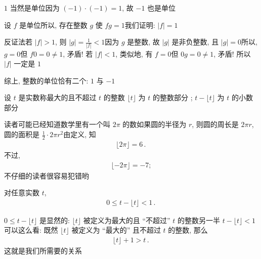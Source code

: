 \begin{pf}
    $1$ 当然是单位\period 因为 $(-1) \cdot (-1) = 1$, 故 $-1$ 也是单位\period

    设 $f$ 是单位\period 所以, 存在整数 $g$ 使 $fg = 1$\period 我们证明: $|f| = 1$\period

    反证法\period 若 $|f| > 1$, 则 $|g| = \frac{1}{|f|} < 1$\period 因为 $g$ 是整数, 故 $|g|$ 是非负整数, 且 $|g| = 0$\period 所以, $g = 0$\period 但 $f0 = 0 \neq 1$, 矛盾! 若 $|f| < 1$, 类似地, 有 $f = 0$\period 但 $0g = 0 \neq 1$, 矛盾! 所以 $|f|$ 一定是 $1$\period

    综上, 整数的单位恰有二个: $1$ 与 $-1$\period
\end{pf}

\begin{definition}
    设 $t$ 是实数\period 称最大的且不超过 $t$ 的整数 $\lfloor t \rfloor$ 为 $t$ 的整数部分 ; $t - \lfloor t \rfloor$ 为 $t$ 的小数部分 \period
\end{definition}

\begin{example}
    读者可能已经知道数学里有一个叫 $2\pi$ 的数\period 如果圆的半径为 $r$, 则圆的周长是 $2\pi r$, 圆的面积是 $\frac12 \cdot 2\pi r^2$\period 由定义, 知
    \begin{align*}
        \lfloor 2\pi \rfloor = 6 \period
    \end{align*}
    不过,
    \begin{align*}
        \lfloor -2\pi \rfloor = -7;
    \end{align*}
    不仔细的读者很容易犯错哟\period
\end{example}

\begin{proposition}
    对任意实数 $t$,
    \begin{align*}
        0 \leq t - \lfloor t \rfloor < 1 \period
    \end{align*}
\end{proposition}

\begin{pf}
    $0 \leq t - \lfloor t \rfloor$ 是显然的: $\lfloor t \rfloor$ 被定义为最大的且 ``不超过'' $t$ 的整数\period 另一半 $t - \lfloor t \rfloor < 1$ 可以这么看: 既然 $\lfloor t \rfloor$ 被定义为 ``最大的'' 且不超过 $t$ 的整数, 那么
    \begin{align*}
        \lfloor t \rfloor + 1 > t \period
    \end{align*}
    这就是我们所需要的关系\period
\end{pf}

